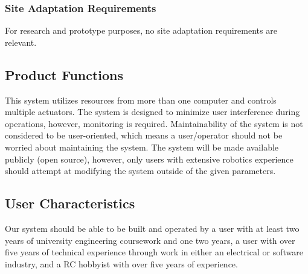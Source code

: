 \documentclass[compsoc,draftclsnofoot,onecolumn,10pt]{IEEEtran}
\begin{document}
\subsubsection{Site Adaptation Requirements}
For research and prototype purposes, no site adaptation requirements are relevant. 

\subsection{Product Functions} %
This system utilizes resources from more than one computer and controls multiple actuators. 
The system is designed to minimize user interference during operations, however, monitoring is required.
Maintainability of the system is not considered to be user-oriented, which means a user/operator should not be worried about maintaining the system. 
The system will be made available publicly (open source), however, only users with extensive robotics experience should attempt at modifying the system outside of the given parameters.



%

\subsection{User Characteristics} %
Our system should be able to be built and operated by a user with at least two 
years of university engineering coursework and one two years, a user with over 
five years of technical experience through work in either an electrical or software 
industry, and a RC hobbyist with over five years of experience. 
\end{document}
